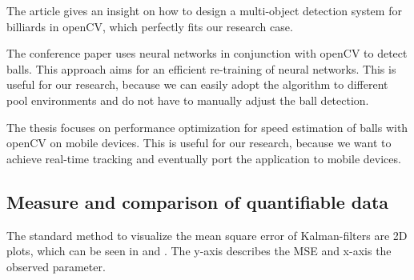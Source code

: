 \documentclass[titlepage, a4paper, 11pt]{scrartcl}
\begin{document}
The article \citep{gao2018design} gives an insight on how to design a multi-object detection system for billiards in openCV, which perfectly fits our research case.

The conference paper \citep{gabel2018jetson} uses neural networks in conjunction with openCV to detect balls.
This approach aims for an efficient re-training of neural networks. This is useful for our research, because we can easily adopt the algorithm to different pool environments and do not have to manually adjust the ball detection.

The thesis \citep{schmidt2016measuring} focuses on performance optimization for speed estimation of balls with openCV on mobile devices. This is useful for our research, because we want to achieve real-time tracking and eventually port the application to mobile devices.

\subsection{Measure and comparison of quantifiable data}

The standard method to visualize the mean square error of Kalman-filters are 2D plots,
which can be seen in \citep{8993001} and \citep{1165091}. The y-axis describes the MSE and x-axis the observed parameter. 

 

\end{document}
